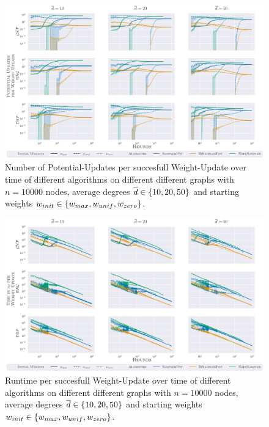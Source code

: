 \begin{figure}
  \centering
  \includegraphics[width=\textwidth]{Figures/experiments/PotPerWU_All.pdf}
  \caption{
    Number of Potential-Updates per succesfull Weight-Update over time of different algorithms on different different graphs with $n = 10000$ nodes, average degrees $\overline{d} \in \left\{10, 20, 50\right\}$ and starting weights $w_{init} \in \left\{w_{max}, w_{unif}, w_{zero}\right\}$.
  }
  \label{fig:app_pot_per_wu}
\end{figure}

\begin{figure}
  \centering
  \includegraphics[width=\textwidth]{Figures/experiments/TimePerWU_All.pdf}
  \caption{
    Runtime per succesfull Weight-Update over time of different algorithms on different different graphs with $n = 10000$ nodes, average degrees $\overline{d} \in \left\{10, 20, 50\right\}$ and starting weights $w_{init} \in \left\{w_{max}, w_{unif}, w_{zero}\right\}$.
  }
  \label{fig:app_time_per_wu}
\end{figure}
